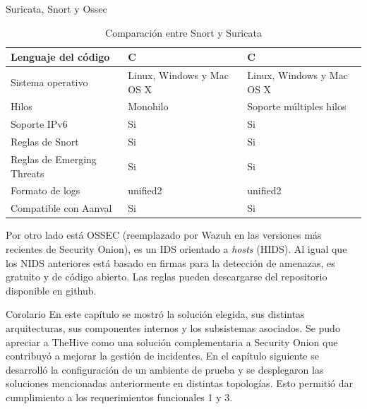\begin{subsection}{Suricata, Snort y Ossec}
\begin{table}[H]
\begin{tabular}{|m{10em}|m{11em}|m{11em}|}
                \hline
                    Lenguaje del código & C  & C  \\
                \hline
                    Sistema operativo & Linux, Windows y Mac OS X  & Linux, Windows y Mac OS X  \\
                \hline
                    Hilos & Monohilo  & Soporte múltiples hilos  \\
                \hline
                    Soporte IPv6 & Si  & Si  \\
                \hline
                    Reglas de Snort & Si  & Si \\
                \hline
                    Reglas de Emerging Threats & Si  & Si \\
                \hline
                    Formato de logs & unified2  & unified2   \\
                \hline
                    Compatible con Aanval & Si  & Si   \\
                \hline %
            \end{tabular}
            \caption{Comparación entre Snort y Suricata}
            \label{table:4}
        \end{table}
        \FloatBarrier
        Por otro lado está OSSEC (reemplazado por  Wazuh en las versiones más recientes de Security Onion), es un IDS orientado a \textit{hosts} (HIDS). Al igual que los NIDS anteriores está basado en firmas para la detección de amenazas, es gratuito y de código abierto. Las reglas pueden descargarse del repositorio disponible en github. \par
   \end{subsection}
   \begin{section}{Corolario}
        En este capítulo se mostró la solución elegida, sus distintas arquitecturas, sus componentes internos y los subsistemas asociados. Se pudo apreciar a TheHive como una solución complementaria a Security Onion que contribuyó a mejorar la gestión de incidentes.
        En el capítulo siguiente se desarrolló la configuración de un ambiente de prueba y se desplegaron las soluciones mencionadas anteriormente en distintas topologías. Esto permitió dar cumplimiento a los requerimientos funcionales 1 y 3. \par
   \end{section}